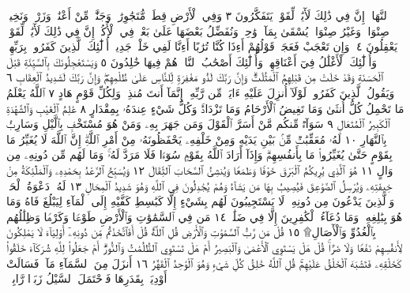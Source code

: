 ٱلنَّهَارَۚ إِنَّ فِي ذَٰلِكَ لَأٓيَٰتࣲ لِّقَوْمࣲ يَتَفَكَّرُونَ ٣ وَفِي ٱلْأَرْضِ
قِطَعࣱ مُّتَجَٰوِرَٰتࣱ وَجَنَّٰتࣱ مِّنْ أَعْنَٰبࣲ وَزَرْعࣱ وَنَخِيلࣱ صِنْوَانࣱ
وَغَيْرُ صِنْوَانࣲ يُسْقَىٰ بِمَآءࣲ وَٰحِدࣲ وَنُفَضِّلُ بَعْضَهَا عَلَىٰ بَعْضࣲ
فِي ٱلْأُكُلِۚ إِنَّ فِي ذَٰلِكَ لَأٓيَٰتࣲ لِّقَوْمࣲ يَعْقِلُونَ ٤۞ وَإِن تَعْجَبْ
فَعَجَبࣱ قَوْلُهُمْ أَءِذَا كُنَّا تُرَٰبًا أَءِنَّا لَفِي خَلْقࣲ جَدِيدٍۗ
أُو۟لَٰٓئِكَ ٱلَّذِينَ كَفَرُوا۟ بِرَبِّهِمْۖ وَأُو۟لَٰٓئِكَ ٱلْأَغْلَٰلُ فِيٓ
أَعْنَاقِهِمْۖ وَأُو۟لَٰٓئِكَ أَصْحَٰبُ ٱلنَّارِۖ هُمْ فِيهَا خَٰلِدُونَ ٥
وَيَسْتَعْجِلُونَكَ بِٱلسَّيِّئَةِ قَبْلَ ٱلْحَسَنَةِ وَقَدْ خَلَتْ مِن
قَبْلِهِمُ ٱلْمَثُلَٰتُۗ وَإِنَّ رَبَّكَ لَذُو مَغْفِرَةࣲ لِّلنَّاسِ عَلَىٰ ظُلْمِهِمْۖ
وَإِنَّ رَبَّكَ لَشَدِيدُ ٱلْعِقَابِ ٦ وَيَقُولُ ٱلَّذِينَ كَفَرُوا۟ لَوْلَآ
أُنزِلَ عَلَيْهِ ءَايَةࣱ مِّن رَّبِّهِۦٓۗ إِنَّمَآ أَنتَ مُنذِرࣱۖ وَلِكُلِّ قَوْمٍ
هَادٍ ٧ ٱللَّهُ يَعْلَمُ مَا تَحْمِلُ كُلُّ أُنثَىٰ وَمَا تَغِيضُ ٱلْأَرْحَامُ
وَمَا تَزْدَادُۚ وَكُلُّ شَيْءٍ عِندَهُۥ بِمِقْدَارٍ ٨ عَٰلِمُ ٱلْغَيْبِ
وَٱلشَّهَٰدَةِ ٱلْكَبِيرُ ٱلْمُتَعَالِ ٩ سَوَآءࣱ مِّنكُم مَّنْ
أَسَرَّ ٱلْقَوْلَ وَمَن جَهَرَ بِهِۦ وَمَنْ هُوَ مُسْتَخْفِۭ بِٱلَّيْلِ وَسَارِبُۢ
بِٱلنَّهَارِ ١٠ لَهُۥ مُعَقِّبَٰتࣱ مِّنۢ بَيْنِ يَدَيْهِ وَمِنْ خَلْفِهِۦ
يَحْفَظُونَهُۥ مِنْ أَمْرِ ٱللَّهِۗ إِنَّ ٱللَّهَ لَا يُغَيِّرُ مَا بِقَوْمٍ حَتَّىٰ يُغَيِّرُوا۟
مَا بِأَنفُسِهِمْۗ وَإِذَآ أَرَادَ ٱللَّهُ بِقَوْمࣲ سُوٓءࣰا فَلَا مَرَدَّ لَهُۥۚ وَمَا
لَهُم مِّن دُونِهِۦ مِن وَالٍ ١١ هُوَ ٱلَّذِي يُرِيكُمُ ٱلْبَرْقَ خَوْفࣰا
وَطَمَعࣰا وَيُنشِئُ ٱلسَّحَابَ ٱلثِّقَالَ ١٢ وَيُسَبِّحُ ٱلرَّعْدُ بِحَمْدِهِۦ
وَٱلْمَلَٰٓئِكَةُ مِنْ خِيفَتِهِۦ وَيُرْسِلُ ٱلصَّوَٰعِقَ فَيُصِيبُ بِهَا
مَن يَشَآءُ وَهُمْ يُجَٰدِلُونَ فِي ٱللَّهِ وَهُوَ شَدِيدُ ٱلْمِحَالِ ١٣
لَهُۥ دَعْوَةُ ٱلْحَقِّۚ وَٱلَّذِينَ يَدْعُونَ مِن دُونِهِۦ لَا يَسْتَجِيبُونَ لَهُم بِشَيْءٍ إِلَّا
كَبَٰسِطِ كَفَّيْهِ إِلَى ٱلْمَآءِ لِيَبْلُغَ فَاهُ وَمَا هُوَ بِبَٰلِغِهِۦۚ وَمَا دُعَآءُ ٱلْكَٰفِرِينَ
إِلَّا فِي ضَلَٰلࣲ ١٤  مَن فِي ٱلسَّمَٰوَٰتِ وَٱلْأَرْضِ طَوْعࣰا
وَكَرْهࣰا وَظِلَٰلُهُم بِٱلْغُدُوِّ وَٱلْأٓصَالِ۩ ١٥ قُلْ مَن رَّبُّ ٱلسَّمَٰوَٰتِ
وَٱلْأَرْضِ قُلِ ٱللَّهُۚ قُلْ أَفَٱتَّخَذْتُم مِّن دُونِهِۦٓ أَوْلِيَآءَ لَا يَمْلِكُونَ
لِأَنفُسِهِمْ نَفْعࣰا وَلَا ضَرࣰّاۚ قُلْ هَلْ يَسْتَوِي ٱلْأَعْمَىٰ وَٱلْبَصِيرُ أَمْ هَلْ
تَسْتَوِي ٱلظُّلُمَٰتُ وَٱلنُّورُۗ أَمْ جَعَلُوا۟ لِلَّهِ شُرَكَآءَ خَلَقُوا۟ كَخَلْقِهِۦ فَتَشَٰبَهَ
ٱلْخَلْقُ عَلَيْهِمْۚ قُلِ ٱللَّهُ خَٰلِقُ كُلِّ شَيْءࣲ وَهُوَ ٱلْوَٰحِدُ ٱلْقَهَّٰرُ ١٦ أَنزَلَ
مِنَ ٱلسَّمَآءِ مَآءࣰ فَسَالَتْ أَوْدِيَةُۢ بِقَدَرِهَا فَٱحْتَمَلَ ٱلسَّيْلُ زَبَدࣰا رَّابِيࣰاۖ
